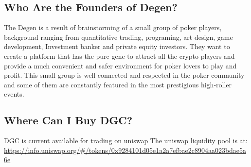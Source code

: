 \documentclass[
]{book}
\begin{document}
\hypertarget{who-are-the-founders-of-degen}{%
\subsection{Who Are the Founders of Degen?}\label{who-are-the-founders-of-degen}}

The Degen is a result of brainstorming of a small group of poker players, background ranging from quantitative trading, programing, art design, game development, Investment banker and private equity investors. They want to create a platform that has the pure gene to attract all the crypto players and provide a much convenient and safer environment for poker lovers to play and profit.
This small group is well connected and respected in the poker community and some of them are constantly featured in the most prestigious high-roller events.

\hypertarget{where-can-i-buy-dgc}{%
\subsection{Where Can I Buy DGC?}\label{where-can-i-buy-dgc}}

DGC is current available for trading on uniswap
The uniswap liquidity pool is at:
\url{https://info.uniswap.org/\#/tokens/0x9284101d05e1a2a7efbae2c8904aa023bdae5a6e}

  
\end{document}
